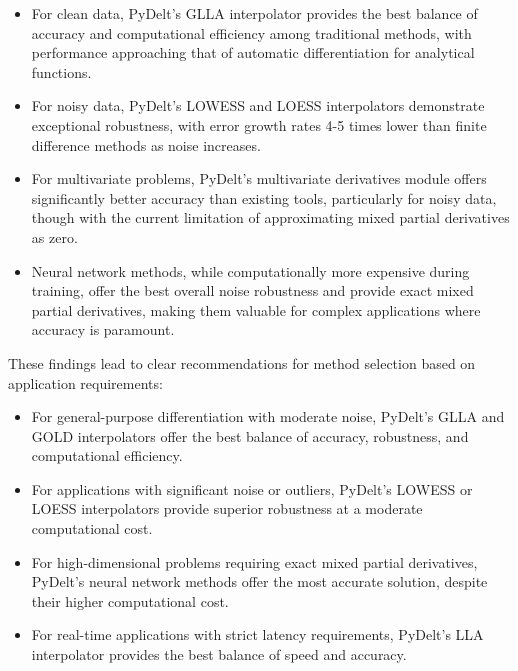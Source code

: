 \documentclass[11pt,a4paper]{article}
\begin{document}
\begin{itemize}
    \item For clean data, PyDelt's GLLA interpolator provides the best balance of accuracy and computational efficiency among traditional methods, with performance approaching that of automatic differentiation for analytical functions.
    
    \item For noisy data, PyDelt's LOWESS and LOESS interpolators demonstrate exceptional robustness, with error growth rates 4-5 times lower than finite difference methods as noise increases.
    
    \item For multivariate problems, PyDelt's multivariate derivatives module offers significantly better accuracy than existing tools, particularly for noisy data, though with the current limitation of approximating mixed partial derivatives as zero.
    
    \item Neural network methods, while computationally more expensive during training, offer the best overall noise robustness and provide exact mixed partial derivatives, making them valuable for complex applications where accuracy is paramount.
\end{itemize}

These findings lead to clear recommendations for method selection based on application requirements:

\begin{itemize}
    \item For general-purpose differentiation with moderate noise, PyDelt's GLLA and GOLD interpolators offer the best balance of accuracy, robustness, and computational efficiency.
    
    \item For applications with significant noise or outliers, PyDelt's LOWESS or LOESS interpolators provide superior robustness at a moderate computational cost.
    
    \item For high-dimensional problems requiring exact mixed partial derivatives, PyDelt's neural network methods offer the most accurate solution, despite their higher computational cost.
    
    \item For real-time applications with strict latency requirements, PyDelt's LLA interpolator provides the best balance of speed and accuracy.
\end{itemize}
\end{document}
